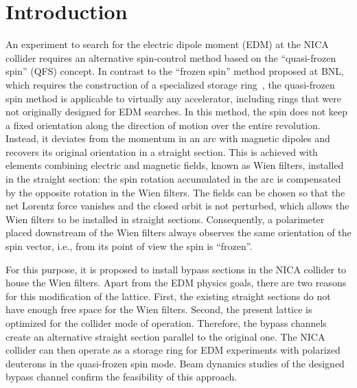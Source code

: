 \section{Introduction}
\label{sec:introduction}

An experiment to search for the electric dipole moment (EDM) at the NICA
collider requires an alternative spin-control method based on the
``quasi-frozen spin'' (QFS) concept. In contrast to the ``frozen spin''
method proposed at BNL, which requires the construction of a specialized storage
ring~\cite{srEDM:2008_deuteron_proposal}, the quasi-frozen spin method is applicable to
virtually any accelerator, including rings that were not originally designed
for EDM searches. In this method, the spin does not keep a fixed orientation
along the direction of motion over the entire revolution. Instead, it deviates
from the momentum in an arc with magnetic dipoles and recovers its original
orientation in a straight section. This is achieved with elements combining
electric and magnetic fields, known as Wien filters, installed in the straight
section: the spin rotation accumulated in the arc is compensated by the
opposite rotation in the Wien filters. The fields can be chosen so that the
net Lorentz force vanishes and the closed orbit is not perturbed, which allows
the Wien filters to be installed in straight sections. Consequently, a
polarimeter placed downstream of the Wien filters always observes the same
orientation of the spin vector, i.e., from its point of view the spin is
``frozen''.

For this purpose, it is proposed to install bypass sections in the NICA
collider to house the Wien filters. Apart from the EDM physics goals, there
are two reasons for this modification of the lattice. First, the existing
straight sections do not have enough free space for the Wien filters. Second,
the present lattice is optimized for the collider mode of operation.
Therefore, the bypass channels create an alternative straight section parallel
to the original one. The NICA collider can then operate as a storage ring for
EDM experiments with polarized deuterons in the quasi-frozen spin mode. Beam
dynamics studies of the designed bypass channel confirm the feasibility of
this approach.

